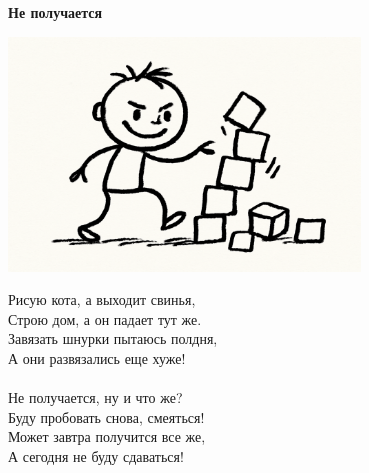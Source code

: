 \vspace*{\fill}
\begin{center}
  {\huge\textbf{Не получается}}

  \vspace{1.5em}
  \includegraphics[width=0.7\textwidth]{pictures/ne_poluchaetsya.png}
  \vspace{4em}
  \parbox{0.6\textwidth}{
    \LARGE
    \begin{spacing}{1.2}
      Рисую кота, а выходит свинья,\\
      Строю дом, а он падает тут же.\\
      Завязать шнурки пытаюсь полдня,\\
      А они развязались еще хуже!\\
      \\
      Не получается, ну и что же?\\
      Буду пробовать снова, смеяться!\\
      Может завтра получится все же,\\
      А сегодня не буду сдаваться! %
    \end{spacing}
      
  }
\end{center}
\vspace*{\fill}